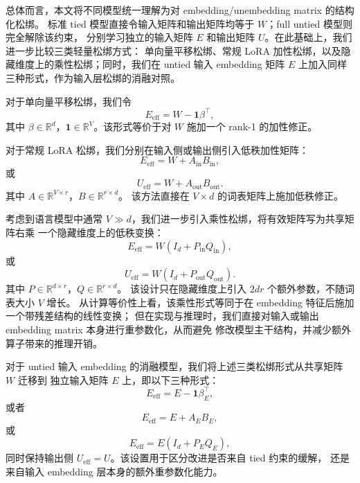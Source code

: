 总体而言，本文将不同模型统一理解为对 embedding/unembedding matrix 的结构化松绑。
标准 tied 模型直接令输入矩阵和输出矩阵均等于 $W$；full untied 模型则完全解除该约束，
分别学习独立的输入矩阵 $E$ 和输出矩阵 $U$。在此基础上，我们进一步比较三类轻量松绑方式：
单向量平移松绑、常规 LoRA 加性松绑，以及隐藏维度上的乘性松绑；同时，我们在 untied
输入 embedding 矩阵 $E$ 上加入同样三种形式，作为输入层松绑的消融对照。

对于单向量平移松绑，我们令
\begin{equation}
    E_{\mathrm{eff}} = W-\mathbf{1}\beta^\top,
\end{equation}
其中 $\beta\in\mathbb{R}^{d}$，$\mathbf{1}\in\mathbb{R}^{V}$。该形式等价于对 $W$
施加一个 rank-1 的加性修正。

对于常规 LoRA 松绑，我们分别在输入侧或输出侧引入低秩加性矩阵：
\begin{equation}
    E_{\mathrm{eff}} = W+A_{\mathrm{in}}B_{\mathrm{in}},
\end{equation}
或
\begin{equation}
    U_{\mathrm{eff}} = W+A_{\mathrm{out}}B_{\mathrm{out}}.
\end{equation}
其中 $A\in\mathbb{R}^{V\times r}$，$B\in\mathbb{R}^{r\times d}$。
该方法直接在 $V\times d$ 的词表矩阵上施加低秩修正。

考虑到语言模型中通常 $V\gg d$，我们进一步引入乘性松绑，将有效矩阵写为共享矩阵右乘
一个隐藏维度上的低秩变换：
\begin{equation}
    E_{\mathrm{eff}} = W(I_d+P_{\mathrm{in}}Q_{\mathrm{in}}),
\end{equation}
或
\begin{equation}
    U_{\mathrm{eff}} = W(I_d+P_{\mathrm{out}}Q_{\mathrm{out}}).
\end{equation}
其中 $P\in\mathbb{R}^{d\times r}$，$Q\in\mathbb{R}^{r\times d}$。
该设计只在隐藏维度上引入 $2dr$ 个额外参数，不随词表大小 $V$ 增长。
从计算等价性上看，该乘性形式等同于在 embedding 特征后施加一个带残差结构的线性变换；
但在实现与推理时，我们直接对输入或输出 embedding matrix 本身进行重参数化，从而避免
修改模型主干结构，并减少额外算子带来的推理开销。

对于 untied 输入 embedding 的消融模型，我们将上述三类松绑形式从共享矩阵 $W$ 迁移到
独立输入矩阵 $E$ 上，即以下三种形式：
\begin{equation}
    E_{\mathrm{eff}} = E-\mathbf{1}\beta_E^\top,
\end{equation}
或者
\begin{equation}
    E_{\mathrm{eff}} = E+A_EB_E,
\end{equation}
或
\begin{equation}
    E_{\mathrm{eff}} = E(I_d+P_EQ_E),
\end{equation}
同时保持输出侧 $U_{\mathrm{eff}}=U$。该设置用于区分改进是否来自 tied 约束的缓解，
还是来自输入 embedding 层本身的额外重参数化能力。
